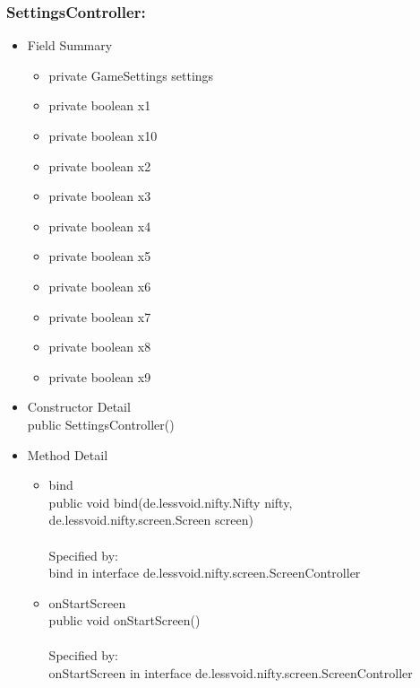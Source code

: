 \documentclass[letterpaper]{article}
\begin{document}
								\subsubsection*{SettingsController:}
								\vspace{0.1in}	
									\begin{itemize}
										\item	Field Summary
												\begin{itemize}
													\item	private GameSettings	settings 
													\item	private boolean	x1 
													\item	private boolean	x10 
													\item	private boolean	x2 
													\item	private boolean	x3 
													\item	private boolean	x4 
													\item	private boolean	x5 
													\item	private boolean	x6 
													\item	private boolean	x7 
													\item	private boolean	x8 
													\item	private boolean	x9 
												\end{itemize}
										\item	Constructor Detail \\
												public SettingsController()
										\item	Method Detail
												\begin{itemize}
													\item	bind \\
															public void bind(de.lessvoid.nifty.Nifty nifty, \\
						        de.lessvoid.nifty.screen.Screen screen) \\ \\
															Specified by: \\
															bind in interface de.lessvoid.nifty.screen.ScreenController
													\item	onStartScreen \\
															public void onStartScreen() \\ \\
															Specified by: \\
															onStartScreen in interface de.lessvoid.nifty.screen.ScreenController

\end{itemize}
\end{itemize}
\end{document}
